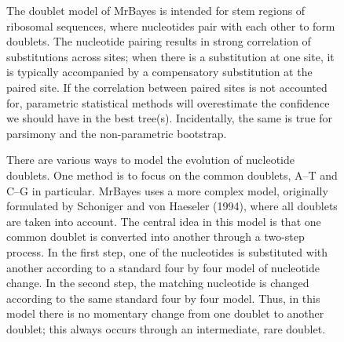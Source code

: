 \documentclass[12pt]{book}
\begin{document}
\begin{figure}[h]
The doublet model of MrBayes is intended for stem regions of ribosomal sequences, where nucleotides
pair with each other to form doublets. The nucleotide pairing results in strong correlation of
substitutions across sites; when there is a substitution at one site, it is typically accompanied
by a compensatory substitution at the paired site. If the correlation between paired sites is not
accounted for, parametric statistical methods will overestimate the confidence we should have in
the best tree(s). Incidentally, the same is true for parsimony and the non-parametric bootstrap.

There are various ways to model the evolution of nucleotide doublets. One method is to focus on the
common doublets, A--T and C--G in particular. MrBayes uses a more complex model, originally
formulated by Schoniger and von Haeseler (1994), where all doublets are taken into account. The
central idea in this model is that one common doublet is converted into another through a two-step
process. In the first step, one of the nucleotides is substituted with another according to a
standard four by four model of nucleotide change. In the second step, the matching nucleotide is
changed according to the same standard four by four model. Thus, in this model there is no
momentary change from one doublet to another doublet; this always occurs through an intermediate,
rare doublet.


\end{figure}
\end{document}
